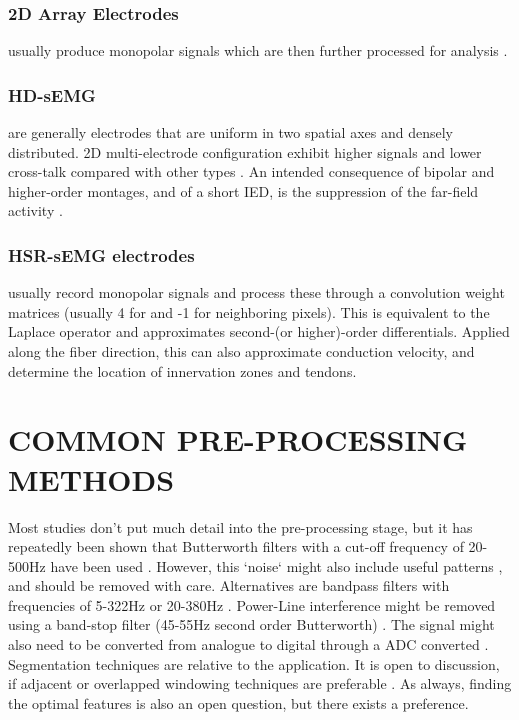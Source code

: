 \documentclass{article}
\begin{document}
\subsubsection{2D Array Electrodes} usually produce monopolar signals which are then further processed for analysis \cite{Kilby2016}. 
\subsubsection{HD-sEMG} are generally electrodes that are uniform in two spatial axes and densely distributed. 2D multi-electrode configuration exhibit higher signals and lower cross-talk compared with other types \cite{Dimitrov2003a}. An intended consequence of bipolar and higher-order montages, and of a short IED, is the suppression of the far-field activity \cite{Kilby2016}.
\subsubsection{HSR-sEMG electrodes} usually record monopolar signals and process these through a convolution weight matrices (usually 4 for  and -1 for neighboring pixels). This is equivalent to the Laplace operator and approximates second-(or higher)-order differentials. Applied along the fiber direction, this can also approximate conduction velocity, and determine the location of innervation zones and tendons.

\section{COMMON PRE-PROCESSING METHODS}
Most studies don't put much detail into the pre-processing stage, but it has repeatedly been shown that Butterworth filters with a cut-off frequency of 20-500Hz have been used \cite{Boxtel2001} \cite{Kim2016}. However, this `noise` might also include useful patterns \cite{Geng2016}, and should be removed with care. Alternatives are bandpass filters with frequencies of 5-322Hz \cite{Sulaiman2016} or 20-380Hz \cite{Du2017}. Power-Line interference might be removed using a band-stop filter (45-55Hz second order Butterworth) \cite{Du2017}. The signal might also need to be converted from analogue to digital through a ADC converted \cite{Sulaiman2016}.  Segmentation techniques are relative to the application. It is open to discussion, if adjacent or overlapped windowing techniques are preferable \cite{Nazmi2016}. As always, finding the optimal features is also an open question, but there exists a preference.
\end{document}
